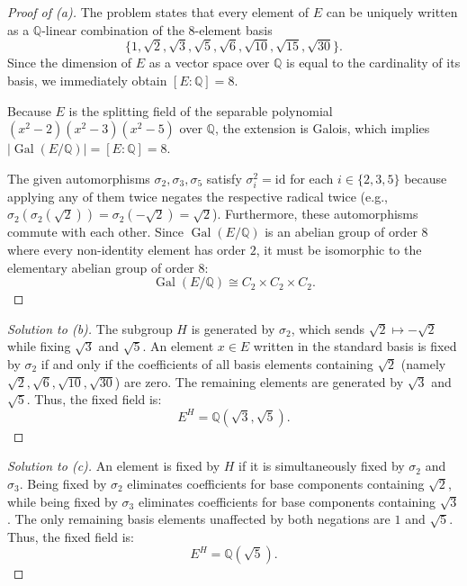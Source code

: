 \begin{proof}[Proof of (a)]
    The problem states that every element of $E$ can be uniquely written as a $\mathbb Q$-linear combination of the $8$-element basis 
    \[
        \{1, \sqrt{2}, \sqrt{3}, \sqrt{5}, \sqrt{6}, \sqrt{10}, \sqrt{15}, \sqrt{30}\}.
    \]
    Since the dimension of $E$ as a vector space over $\mathbb Q$ is equal to the cardinality of its basis, we immediately obtain $[E:\mathbb Q] = 8$.

    Because $E$ is the splitting field of the separable polynomial $(x^2-2)(x^2-3)(x^2-5)$ over $\mathbb Q$, the extension is Galois, which implies $|\operatorname{Gal}(E/\mathbb Q)| = [E:\mathbb Q] = 8$. 
    
    The given automorphisms $\sigma_2, \sigma_3, \sigma_5$ satisfy $\sigma_i^2 = \text{id}$ for each $i \in \{2, 3, 5\}$ because applying any of them twice negates the respective radical twice (e.g., $\sigma_2(\sigma_2(\sqrt{2})) = \sigma_2(-\sqrt{2}) = \sqrt{2}$). Furthermore, these automorphisms commute with each other. Since $\operatorname{Gal}(E/\mathbb Q)$ is an abelian group of order $8$ where every non-identity element has order $2$, it must be isomorphic to the elementary abelian group of order $8$:
    \[
        \operatorname{Gal}(E/\mathbb Q) \cong C_2 \times C_2 \times C_2.
    \]
\end{proof}
    
\begin{proof}[Solution to (b)]
    The subgroup $H$ is generated by $\sigma_2$, which sends $\sqrt{2} \mapsto -\sqrt{2}$ while fixing $\sqrt{3}$ and $\sqrt{5}$. An element $x \in E$ written in the standard basis is fixed by $\sigma_2$ if and only if the coefficients of all basis elements containing $\sqrt{2}$ (namely $\sqrt{2}, \sqrt{6}, \sqrt{10}, \sqrt{30}$) are zero. The remaining elements are generated by $\sqrt{3}$ and $\sqrt{5}$. Thus, the fixed field is:
    \[
        E^H = \mathbb Q(\sqrt{3}, \sqrt{5}).
    \]
\end{proof}

\begin{proof}[Solution to (c)]
    An element is fixed by $H$ if it is simultaneously fixed by $\sigma_2$ and $\sigma_3$. 
    Being fixed by $\sigma_2$ eliminates coefficients for base components containing $\sqrt{2}$, while being fixed by $\sigma_3$ eliminates coefficients for base components containing $\sqrt{3}$. The only remaining basis elements unaffected by both negations are $1$ and $\sqrt{5}$. Thus, the fixed field is:
    \[
        E^H = \mathbb Q(\sqrt{5}).
    \]
\end{proof}

